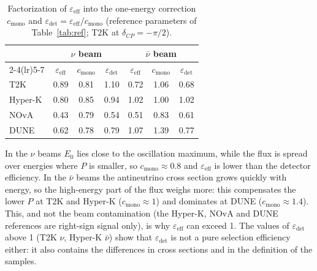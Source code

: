 \documentclass[11pt,a4paper]{article}
\begin{document}
\begin{table}[ht]
\centering
\caption{Factorization of $\varepsilon_\text{eff}$ into the one-energy correction $c_\text{mono}$ and
$\varepsilon_\text{det}=\varepsilon_\text{eff}/c_\text{mono}$ (reference parameters of Table~\ref{tab:ref};
T2K at $\delta_{CP}=-\pi/2$).}
\label{tab:cmono}
\small
\begin{tabular}{lcccccc}
\toprule
 & \multicolumn{3}{c}{$\nu$ beam} & \multicolumn{3}{c}{$\bar\nu$ beam} \\
\cmidrule(lr){2-4}\cmidrule(lr){5-7}
 & $\varepsilon_\text{eff}$ & $c_\text{mono}$ & $\varepsilon_\text{det}$ & $\varepsilon_\text{eff}$ & $c_\text{mono}$ & $\varepsilon_\text{det}$ \\
\midrule
T2K     & 0.89 & 0.81 & 1.10 & 0.72 & 1.06 & 0.68 \\
Hyper-K & 0.80 & 0.85 & 0.94 & 1.02 & 1.00 & 1.02 \\
NOvA    & 0.43 & 0.79 & 0.54 & 0.51 & 0.83 & 0.61 \\
DUNE    & 0.62 & 0.78 & 0.79 & 1.07 & 1.39 & 0.77 \\
\bottomrule
\end{tabular}
\end{table}

In the $\nu$ beams $E_0$ lies close to the oscillation maximum, while the flux is spread over energies where $P$ is
smaller, so $c_\text{mono}\approx 0.8$ and $\varepsilon_\text{eff}$ is lower than the detector efficiency.
In the $\bar\nu$ beams the antineutrino cross section grows quickly with energy, so the high-energy part of the flux
weighs more: this compensates the lower $P$ at T2K and Hyper-K ($c_\text{mono}\approx 1$) and dominates at DUNE
($c_\text{mono}\approx 1.4$). This, and not the beam contamination (the Hyper-K, NOvA and DUNE references are
right-sign signal only), is why $\varepsilon_\text{eff}$ can exceed 1. The values of $\varepsilon_\text{det}$ above 1
(T2K $\nu$, Hyper-K $\bar\nu$) show that $\varepsilon_\text{det}$ is not a pure selection efficiency either: it also
contains the differences in cross sections and in the definition of the samples.
\end{document}
